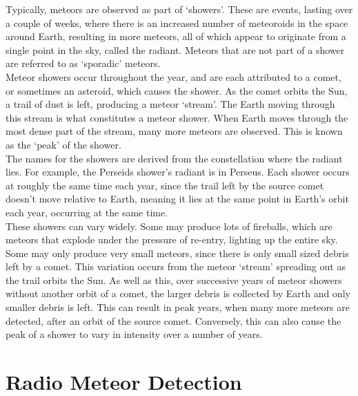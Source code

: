 \documentclass[12pt]{article}
\begin{document}
\large{
Typically, meteors are observed as part of `showers'. These are events, lasting
over a couple of weeks, where there is an increased number of meteoroids in the
space around Earth, resulting in more meteors, all of which appear to originate
from a single point in the sky, called the radiant. Meteors that are not part
of a shower are referred to as `sporadic' meteors.\\

Meteor showers occur throughout the year, and are each attributed to a comet,
or sometimes an asteroid, which causes the shower. As the comet orbits the Sun,
a trail of dust is left, producing a meteor `stream'. The Earth moving through
this stream is what constitutes a meteor shower. When Earth moves through the
most dense part of the stream, many more meteors are observed. This is known as
the `peak' of the shower.\\

The names for the showers are derived from the constellation where the radiant
lies. For example, the Perseids shower's radiant is in Perseus. Each shower
occurs at roughly the same time each year, since the trail left by the source
comet doesn't move relative to Earth, meaning it lies at the same point in
Earth's orbit each year, occurring at the same time. \\

These showers can vary widely. Some may produce lots of fireballs, which are
meteors that explode under the pressure of re-entry, lighting up the entire
sky.  Some may only produce very small meteors, since there is only small sized
debris left by a comet. This variation occurs from the meteor `stream'
spreading out as the trail orbits the Sun. As well as this, over successive
years of meteor showers without another orbit of a comet, the larger debris is
collected by Earth and only smaller debris is left. This can result in peak
years, when many more meteors are detected, after an orbit of the source comet.
Conversely, this can also cause the peak of a shower to vary in intensity over
a number of years.
}

\section{Radio Meteor Detection}
\end{document}
